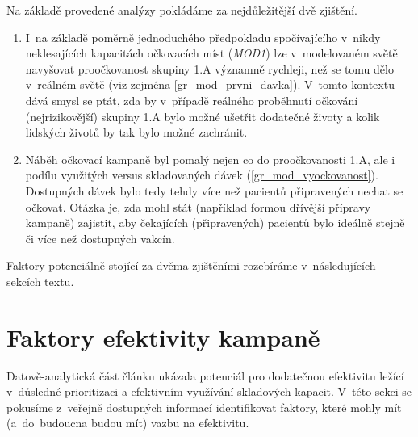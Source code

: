 Na základě provedené analýzy pokládáme za nejdůležitější dvě zjištění.
\begin{enumerate}
\item I~na základě poměrně jednoduchého předpokladu spočívajícího v~nikdy neklesajících kapacitách očkovacích míst (\emph{MOD1}) lze v~modelovaném světě na\-vy\-šo\-vat proočkovanost skupiny 1.A významně rychleji, než se tomu dělo v~reálném světě (viz zejména  \ref{gr_mod_prvni_davka}). V~tomto kontextu dává smysl se ptát, zda by v~případě reálného proběhnutí očkování (nejrizikovější) skupiny 1.A bylo možné ušetřit dodatečné životy a kolik lidských životů by tak bylo možné zachránit.
\item Náběh očkovací kampaně byl pomalý nejen co do proočkovanosti 1.A, ale i podílu využitých versus skladovaných dávek (\ref{gr_mod_vyockovanost}). Dostupných dávek bylo tedy tehdy více než pacientů připravených nechat se očkovat. Otázka je, zda mohl stát (například formou dřívější přípravy kampaně) zajistit, aby čekajících (připravených) pacientů bylo ideálně stejně či více než dostupných vakcín.
\end{enumerate}
Faktory potenciálně stojící za dvěma zjištěními rozebíráme v~následujících sekcích textu.






\section*{Faktory efektivity kampaně}
\label{sec:shrnuti}


Datově-analytická část článku ukázala potenciál pro dodatečnou efektivitu ležící v~důsledné prioritizaci a efektivním využívání skladových kapacit. V~této sekci se pokusíme z~veřejně dostupných informací identifikovat faktory, které mohly mít (a~do~budoucna budou mít) vazbu na efektivitu. %

